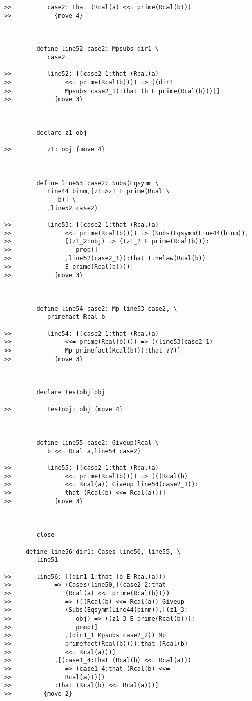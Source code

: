 \documentclass[12pt]{article}
\begin{document}
\begin{verbatim}
>>          case2: that (Rcal(a) <<= prime(Rcal(b)))
>>            {move 4}



         define line52 case2: Mpsubs dir1 \
            case2

>>          line52: [(case2_1:that (Rcal(a)
>>               <<= prime(Rcal(b)))) => ((dir1
>>               Mpsubs case2_1):that (b E prime(Rcal(b))))]
>>            {move 3}



         declare z1 obj

>>          z1: obj {move 4}



         define line53 case2: Subs(Eqsymm \
            Line44 binm,[z1=>z1 E prime(Rcal \
               b)] \
            ,line52 case2)

>>          line53: [(case2_1:that (Rcal(a)
>>               <<= prime(Rcal(b)))) => (Subs(Eqsymm(Line44(binm)),
>>               [(z1_2:obj) => ((z1_2 E prime(Rcal(b))):
>>                  prop)]
>>               ,line52(case2_1)):that (thelaw(Rcal(b))
>>               E prime(Rcal(b))))]
>>            {move 3}



         define line54 case2: Mp line53 case2, \
            primefact Rcal b

>>          line54: [(case2_1:that (Rcal(a)
>>               <<= prime(Rcal(b)))) => ((line53(case2_1)
>>               Mp primefact(Rcal(b))):that ??)]
>>            {move 3}



         declare testobj obj

>>          testobj: obj {move 4}



         define line55 case2: Giveup(Rcal \
            b <<= Rcal a,line54 case2)

>>          line55: [(case2_1:that (Rcal(a)
>>               <<= prime(Rcal(b)))) => (((Rcal(b)
>>               <<= Rcal(a)) Giveup line54(case2_1)):
>>               that (Rcal(b) <<= Rcal(a)))]
>>            {move 3}



         close

      define line56 dir1: Cases line50, line55, \
         line51

>>       line56: [(dir1_1:that (b E Rcal(a)))
>>            => (Cases(line50,[(case2_2:that
>>               (Rcal(a) <<= prime(Rcal(b))))
>>               => (((Rcal(b) <<= Rcal(a)) Giveup
>>               (Subs(Eqsymm(Line44(binm)),[(z1_3:
>>                  obj) => ((z1_3 E prime(Rcal(b))):
>>                  prop)]
>>               ,(dir1_1 Mpsubs case2_2)) Mp
>>               primefact(Rcal(b)))):that (Rcal(b)
>>               <<= Rcal(a)))]
>>            ,[(case1_4:that (Rcal(b) <<= Rcal(a)))
>>               => (case1_4:that (Rcal(b) <<=
>>               Rcal(a)))])
>>            :that (Rcal(b) <<= Rcal(a)))]
>>         {move 2}




\end{verbatim}
\end{document}
